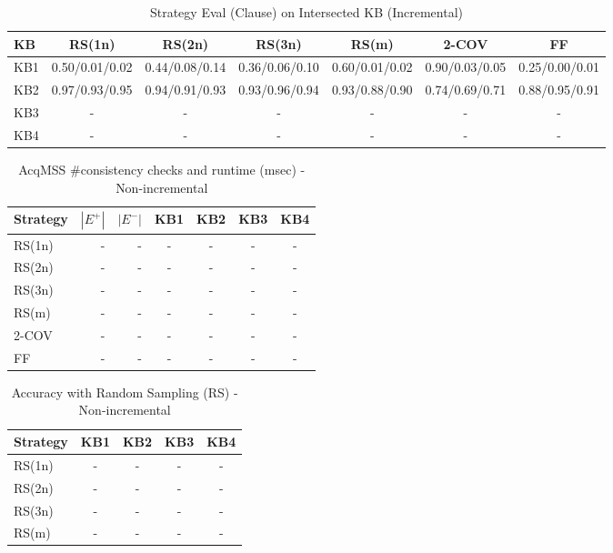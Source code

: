 \begin{table}[htbp]
\centering
\caption{Strategy Eval (Clause) on Intersected KB (Incremental)}
\label{tab:eval_clause_incremental}
\begin{tabular}{lcccccc}
\toprule
KB & RS(1n) & RS(2n) & RS(3n) & RS(m) & 2-COV & FF \\
\midrule
KB1 & 0.50/0.01/0.02 & 0.44/0.08/0.14 & 0.36/0.06/0.10 & 0.60/0.01/0.02 & 0.90/0.03/0.05 & 0.25/0.00/0.01 \\
KB2 & 0.97/0.93/0.95 & 0.94/0.91/0.93 & 0.93/0.96/0.94 & 0.93/0.88/0.90 & 0.74/0.69/0.71 & 0.88/0.95/0.91 \\
KB3 & - & - & - & - & - & - \\
KB4 & - & - & - & - & - & - \\
\bottomrule
\end{tabular}
\end{table}

\begin{table}[htbp]
\centering
\caption{AcqMSS \#consistency checks and runtime (msec) - Non-incremental}
\label{tab:table7_non-incremental}
\begin{tabular}{lrrcccc}
\toprule
Strategy & $|E^+|$ & $|E^-|$ & KB1 & KB2 & KB3 & KB4 \\
\midrule
RS(1n) & - & - & - & - & - & - \\
RS(2n) & - & - & - & - & - & - \\
RS(3n) & - & - & - & - & - & - \\
RS(m) & - & - & - & - & - & - \\
2-COV & - & - & - & - & - & - \\
FF & - & - & - & - & - & - \\
\bottomrule
\end{tabular}
\end{table}

\begin{table}[htbp]
\centering
\caption{Accuracy with Random Sampling (RS) - Non-incremental}
\label{tab:table9_non-incremental}
\begin{tabular}{lcccc}
\toprule
Strategy & KB1 & KB2 & KB3 & KB4 \\
\midrule
RS(1n) & - & - & - & - \\
RS(2n) & - & - & - & - \\
RS(3n) & - & - & - & - \\
RS(m) & - & - & - & - \\
\bottomrule
\end{tabular}
\end{table}

